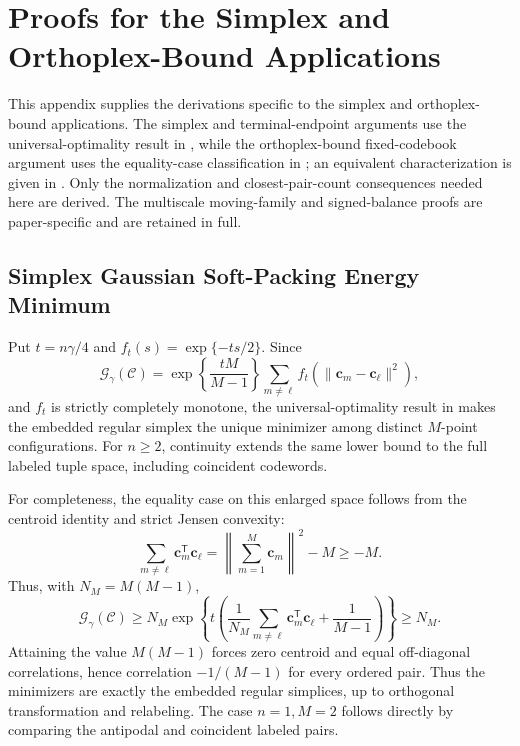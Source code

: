 \documentclass[12pt,draftclsnofoot,onecolumn]{IEEEtran}
\newcommand{\cC}{\mathcal{C}}
\newcommand{\cG}{\mathcal{G}}
\newcommand{\bc}{\bm c}
\theoremstyle{definition}
\begin{document}
\section{Proofs for the Simplex and Orthoplex-Bound Applications}
\label{app:simplex-orthoplex-application-proofs}

This appendix supplies the derivations specific to the simplex and
orthoplex-bound applications.  The simplex and terminal-endpoint arguments
use the universal-optimality result in
\cite[Thm.~1.2 and Table~1]{CohnKumar2007}, while the orthoplex-bound
fixed-codebook argument uses the equality-case classification in
\cite[Thm.~3]{Kuperberg2007}; an equivalent characterization is given in
\cite[Thm.~2.2]{KingMixonParshallWells2026}.
Only the normalization and closest-pair-count consequences needed here are
derived.  The multiscale moving-family and signed-balance proofs are
paper-specific and are retained in full.

\subsection{Simplex Gaussian Soft-Packing Energy Minimum}

\begin{IEEEproof}
Put \(t=n\gamma/4\) and \(f_t(s)=\exp\{-ts/2\}\).  Since
\begin{equation*}
  \cG_\gamma(\cC)
  =\exp\left\{\frac{tM}{M-1}\right\}
  \sum_{m\ne\ell}f_t(\|\bc_m-\bc_\ell\|^2),
\end{equation*}
and \(f_t\) is strictly completely monotone, the universal-optimality
result in
\cite[Thm.~1.2, Table~1, and the simplex special case]{CohnKumar2007}
makes the embedded regular simplex the unique minimizer among distinct
\(M\)-point configurations.
For \(n\ge2\), continuity extends the same lower bound to the full
labeled tuple space, including coincident codewords.

For completeness, the equality case on this enlarged space follows
from the centroid identity and strict Jensen convexity:
\begin{equation*}
  \sum_{m\ne\ell}\bc_m^{\mathsf T}\bc_\ell
  =\left\|\sum_{m=1}^M\bc_m\right\|^2-M\ge-M.
\end{equation*}
Thus, with \(N_M=M(M-1)\),
\begin{equation*}
  \cG_\gamma(\cC)
  \ge
  N_M\exp\left\{t\left(
  \frac{1}{N_M}\sum_{m\ne\ell}\bc_m^{\mathsf T}\bc_\ell
  +\frac{1}{M-1}\right)\right\}
  \ge N_M.
\end{equation*}
Attaining the value \(M(M-1)\) forces zero centroid and equal
off-diagonal correlations, hence correlation \(-1/(M-1)\) for every
ordered pair.  Thus the minimizers are exactly the embedded regular
simplices, up to orthogonal transformation and relabeling.  The case
\(n=1,M=2\) follows directly by comparing the antipodal and coincident
labeled pairs.
\end{IEEEproof}
\end{document}
